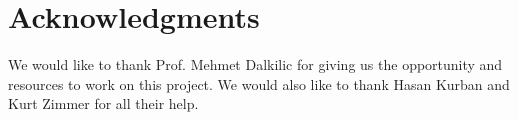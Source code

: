 \documentclass[fleqn,10pt]{SelfArx} %
\begin{document}
	\section*{Acknowledgments} %
	
	We would like to thank Prof. Mehmet Dalkilic for giving us the opportunity and resources to work on this project. We would also like to thank Hasan Kurban and Kurt Zimmer for all their help.
	
	
	
	
\end{document}
